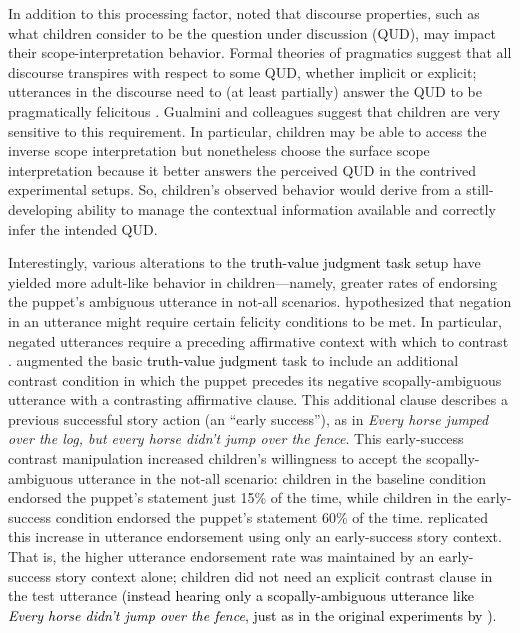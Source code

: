 \documentclass[cm]{glossa}
\newcommand{\lp}[1]{\textcolor{black}{#1}} %
\begin{document}
In addition to this processing factor, \cite{gualmini2008question} noted that discourse properties, such as what children consider to be the question under discussion (QUD), may impact their scope-interpretation behavior.  Formal theories of pragmatics suggest that all discourse transpires with respect to some QUD, whether implicit or explicit; utterances in the discourse need to (at least partially) answer the QUD to be pragmatically felicitous \citep{roberts2012information}. Gualmini and colleagues \citep{hulsey2004question, gualmini2008question} suggest that children are very sensitive to this requirement. In particular, children may be able to access the inverse scope interpretation but nonetheless choose the surface scope interpretation because it better answers the perceived QUD in the contrived experimental setups. So, children's observed behavior would derive from a still-developing ability to manage the contextual information available and correctly infer the intended QUD.

Interestingly, various alterations to the %
\lp{truth-value judgment task}
setup have yielded more adult-like behavior in children---namely, greater rates of endorsing the puppet's ambiguous utterance in not-all scenarios. \cite{musolinolidz2006} hypothesized that negation in an utterance might require certain felicity conditions to be met. In particular, negated utterances require a preceding affirmative context with which to contrast \citep{wason1965contexts}.  \citeauthor{musolinolidz2006} augmented the basic %
\lp{truth-value judgment}
task to include an additional contrast condition in which the puppet precedes its negative scopally-ambiguous utterance with a contrasting affirmative clause. This additional clause describes a previous successful story action (an ``early success''),  as in \textit{Every horse jumped over the log, but every horse didn't jump over the fence}. This early-success contrast manipulation increased children's willingness to accept the scopally-ambiguous utterance in the {not-all} scenario: children in the baseline condition endorsed the puppet's statement just 15\% of the time, while children in the early-success condition endorsed the puppet's statement 60\% of the time. \cite{viauetal2010} replicated this increase in utterance endorsement using only an early-success story context. That is, the higher utterance endorsement rate was maintained by an early-success story context alone; children did not need an explicit contrast clause in the test utterance 
\lp{(instead hearing only a scopally-ambiguous utterance like \textit{Every horse didn't jump over the fence}, just as in the original experiments by \citeauthor{musolinolidz2006})}.
\end{document}
